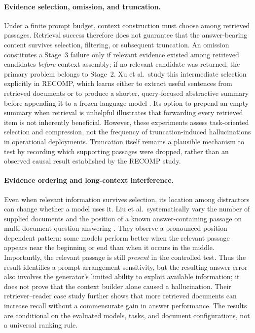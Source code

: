 \paragraph{Evidence selection, omission, and truncation.}
Under a finite prompt budget, context construction must choose among retrieved passages. Retrieval success therefore does not guarantee that the answer-bearing content survives selection, filtering, or subsequent truncation. An omission constitutes a Stage~3 failure only if relevant evidence existed among retrieved candidates \emph{before} context assembly; if no relevant candidate was returned, the primary problem belongs to Stage~2. Xu et al.\ study this intermediate selection explicitly in RECOMP, which learns either to extract useful sentences from retrieved documents or to produce a shorter, query-focused abstractive summary before appending it to a frozen language model \cite[Secs.~2--3]{xu2024recomp}. Its option to prepend an empty summary when retrieval is unhelpful illustrates that forwarding every retrieved item is not inherently beneficial. However, these experiments assess task-oriented selection and compression, not the frequency of truncation-induced hallucinations in operational deployments. Truncation itself remains a plausible mechanism to test by recording which supporting passages were dropped, rather than an observed causal result established by the RECOMP study.

\paragraph{Evidence ordering and long-context interference.}
Even when relevant information survives selection, its location among distractors can change whether a model uses it. Liu et al.\ systematically vary the number of supplied documents and the position of a known answer-containing passage on multi-document question answering \cite[Secs.~2 and 5]{liu2024lost}. They observe a pronounced position-dependent pattern: some models perform better when the relevant passage appears near the beginning or end than when it occurs in the middle. Importantly, the relevant passage is still \emph{present} in the controlled test. Thus the result identifies a prompt-arrangement sensitivity, but the resulting answer error also involves the generator's limited ability to exploit available information; it does not prove that the context builder alone caused a hallucination. Their retriever--reader case study further shows that more retrieved documents can increase recall without a commensurate gain in answer performance. The results are conditional on the evaluated models, tasks, and document configurations, not a universal ranking rule.

